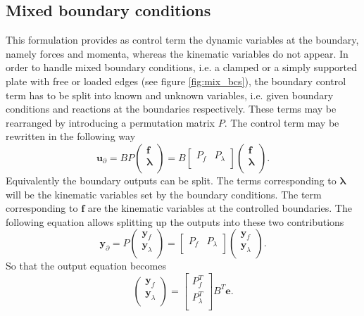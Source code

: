 \documentclass[preprint,12pt]{elsarticle}
\begin{document}
\subsection{Mixed boundary conditions}
\label{sec:mix_bd}
This formulation provides as control term the dynamic variables at the boundary, namely forces and momenta, whereas the kinematic variables do not appear. In order to handle mixed boundary conditions, i.e. a clamped or a simply supported plate with free or loaded edges (see figure \ref{fig:mix_bcs}), the boundary control term has to be split into known and unknown variables, i.e. given boundary conditions and reactions at the boundaries respectively. These terms may be rearranged by introducing a permutation matrix $P$. The control term may be rewritten in the following way
\begin{equation}
\bm{u}_{\partial} = B P 
\begin{pmatrix}
\bm{f} \\
\bm{\lambda} \\
\end{pmatrix} = 
B \begin{bmatrix}
P_{f} & P_{\lambda} \\
\end{bmatrix}
\begin{pmatrix}
\bm{f} \\
\bm{\lambda} \\
\end{pmatrix}.
\end{equation}
Equivalently the boundary outputs can be split. The terms corresponding to $\bm\lambda$ will be the kinematic variables set by the boundary conditions. The term corresponding to $\bm{f}$ are the kinematic variables at the controlled boundaries. The following equation allows splitting up the outputs into these two contributions
\begin{equation}
\bm{y}_{\partial} = P 
\begin{pmatrix}
\bm{y}_{f} \\
\bm{y}_{\lambda} \\
\end{pmatrix} = 
\begin{bmatrix}
P_{f} & P_{\lambda} \\
\end{bmatrix}
\begin{pmatrix}
\bm{y}_{f} \\
\bm{y}_{\lambda} \\
\end{pmatrix}.
\end{equation}
So that the output equation becomes
\begin{equation}
\begin{pmatrix}
\bm{y}_{f} \\
\bm{y}_{\lambda} \\
\end{pmatrix} = 
\begin{bmatrix}
P_{f}^T \\
P_{\lambda}^T \\
\end{bmatrix}
B^T \bm{e}.
\end{equation}
\end{document}
